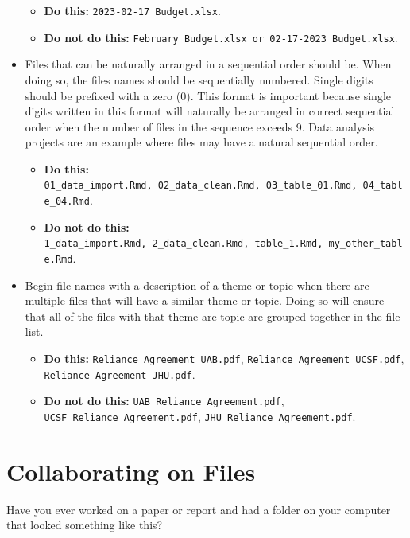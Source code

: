 \documentclass[
  letterpaper,
  DIV=11,
  numbers=noendperiod]{scrreprt}
\providecommand{\tightlist}{%
  \setlength{\itemsep}{0pt}\setlength{\parskip}{0pt}}\usepackage{longtable,booktabs,array}
\begin{document}
\begin{itemize}
  \begin{itemize}
  \tightlist
  \item
    \textbf{Do this:} \texttt{2023-02-17\ Budget.xlsx}.
  \item
    \textbf{Do not do this:}
    \texttt{February\ Budget.xlsx\ or\ 02-17-2023\ Budget.xlsx}.
  \end{itemize}
\item
  Files that can be naturally arranged in a sequential order should be.
  When doing so, the files names should be sequentially numbered. Single
  digits should be prefixed with a zero (0). This format is important
  because single digits written in this format will naturally be
  arranged in correct sequential order when the number of files in the
  sequence exceeds 9. Data analysis projects are an example where files
  may have a natural sequential order.

  \begin{itemize}
  \tightlist
  \item
    \textbf{Do this:}
    \texttt{01\_data\_import.Rmd,\ 02\_data\_clean.Rmd,\ 03\_table\_01.Rmd,\ 04\_table\_04.Rmd}.
  \item
    \textbf{Do not do this:}
    \texttt{1\_data\_import.Rmd,\ 2\_data\_clean.Rmd,\ table\_1.Rmd,\ my\_other\_table.Rmd}.
  \end{itemize}
\item
  Begin file names with a description of a theme or topic when there are
  multiple files that will have a similar theme or topic. Doing so will
  ensure that all of the files with that theme are topic are grouped
  together in the file list.

  \begin{itemize}
  \tightlist
  \item
    \textbf{Do this:} \texttt{Reliance\ Agreement\ UAB.pdf},
    \texttt{Reliance\ Agreement\ UCSF.pdf},
    \texttt{Reliance\ Agreement\ JHU.pdf}.
  \item
    \textbf{Do not do this:} \texttt{UAB\ Reliance\ Agreement.pdf},
    \texttt{UCSF\ Reliance\ Agreement.pdf},
    \texttt{JHU\ Reliance\ Agreement.pdf}.
  \end{itemize}
\end{itemize}

\chapter{Collaborating on Files}\label{sec-collab}

Have you ever worked on a paper or report and had a folder on your
computer that looked something like this?
\end{document}
